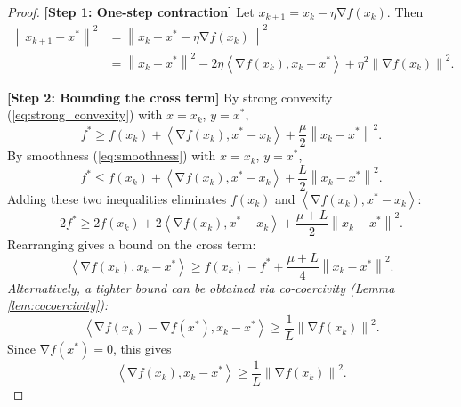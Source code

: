 \documentclass[11pt]{article}
\DeclareMathOperator{\grad}{\nabla}
\newcommand{\norm}[1]{\left\|#1\right\|}
\newcommand{\inner}[2]{\left\langle #1, #2 \right\rangle}
\begin{document}
\begin{proof}
    \textbf{[Step 1: One-step contraction]} Let $x_{k+1} = x_k - \eta \grad f(x_k)$. Then
    \begin{align}
        \norm{x_{k+1} - x^*}^2
        &= \norm{x_k - x^* - \eta \grad f(x_k)}^2 \\
        &= \norm{x_k - x^*}^2 - 2\eta \inner{\grad f(x_k)}{x_k - x^*} + \eta^2 \norm{\grad f(x_k)}^2. \label{eq:expand}
    \end{align}

    \textbf{[Step 2: Bounding the cross term]} By strong convexity (\ref{eq:strong_convexity}) with $x = x_k$, $y = x^*$,
    \begin{equation}
        f^* \ge f(x_k) + \inner{\grad f(x_k)}{x^* - x_k} + \frac{\mu}{2}\norm{x_k - x^*}^2.
    \end{equation}
    By smoothness (\ref{eq:smoothness}) with $x = x_k$, $y = x^*$,
    \begin{equation}
        f^* \le f(x_k) + \inner{\grad f(x_k)}{x^* - x_k} + \frac{L}{2}\norm{x_k - x^*}^2.
    \end{equation}
    Adding these two inequalities eliminates $f(x_k)$ and $\inner{\grad f(x_k)}{x^* - x_k}$:
    \begin{equation}
        2f^* \ge 2f(x_k) + 2\inner{\grad f(x_k)}{x^* - x_k} + \frac{\mu + L}{2}\norm{x_k - x^*}^2.
    \end{equation}
    Rearranging gives a bound on the cross term:
    \begin{equation}
        \inner{\grad f(x_k)}{x_k - x^*} \ge f(x_k) - f^* + \frac{\mu + L}{4}\norm{x_k - x^*}^2. \label{eq:cross_bound}
    \end{equation}
    \textit{Alternatively, a tighter bound can be obtained via co-coercivity (Lemma \ref{lem:cocoercivity}):}
    \begin{equation}
        \inner{\grad f(x_k) - \grad f(x^*)}{x_k - x^*} \ge \frac{1}{L}\norm{\grad f(x_k)}^2.
    \end{equation}
    Since $\grad f(x^*) = 0$, this gives
    \begin{equation}
        \inner{\grad f(x_k)}{x_k - x^*} \ge \frac{1}{L}\norm{\grad f(x_k)}^2. \label{eq:cocoercivity_bound}
    \end{equation}


\end{proof}
\end{document}
